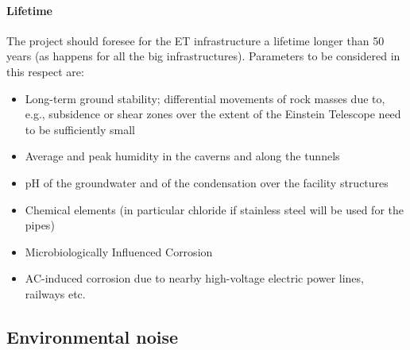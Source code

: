 \paragraph{Lifetime}  The project should foresee for the ET infrastructure a lifetime longer than 50 years (as happens for all the big infrastructures). Parameters to be considered in this respect are:
\begin{itemize}
\item	Long-term ground stability; differential movements of rock masses due to, e.g., subsidence or shear zones over the extent of the Einstein Telescope need to be sufficiently small 
\item	Average and peak humidity in the caverns and along the tunnels
\item	pH of the groundwater and of the condensation over the facility structures
\item	Chemical elements (in particular chloride if stainless steel will be used for the pipes)
\item	Microbiologically Influenced Corrosion
\item	AC-induced corrosion due to nearby high-voltage electric power lines, railways etc.
\end{itemize}

\subsection{Environmental noise}
\label{sec:envnoise}

\FloatBarrier
